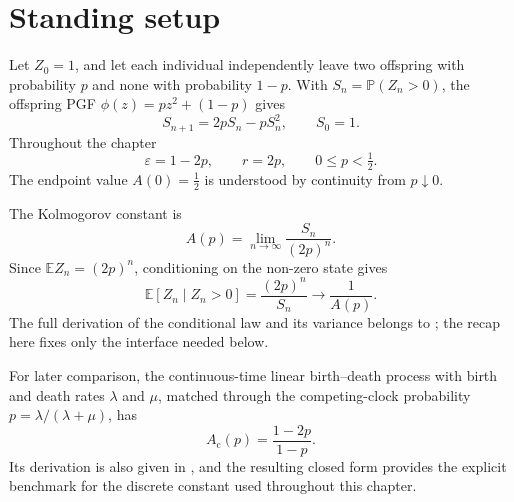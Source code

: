 \section{Standing setup}\label{a:sec:setup}

Let \(Z_0=1\), and let each individual independently leave two offspring with
probability \(p\) and none with probability \(1-p\).  With
\(S_n=\mathbb P(Z_n>0)\), the offspring PGF
\(\phi(z)=pz^2+(1-p)\) gives
\begin{equation}
 S_{n+1}=2pS_n-pS_n^2,
 \qquad S_0=1.
 \label{a:eq:SnIter}
\end{equation}
Throughout the chapter
\begin{equation}
 \varepsilon=1-2p,
 \qquad r=2p,
 \qquad 0\le p<\tfrac12.
 \label{a:eq:epsdef}
\end{equation}
The endpoint value \(A(0)=\tfrac12\) is understood by continuity from
\(p\downarrow0\).

The Kolmogorov constant is
\begin{equation}
 A(p)=\lim_{n\to\infty}\frac{S_n}{(2p)^n}.
 \label{a:eq:setup-A}
\end{equation}
Since \(\mathbb E Z_n=(2p)^n\), conditioning on the non-zero state gives
\begin{equation}
 \mathbb E[Z_n\mid Z_n>0]=\frac{(2p)^n}{S_n}
 \longrightarrow\frac1{A(p)}.
 \label{a:eq:qsmean}
\end{equation}
The full derivation of the conditional law and its variance belongs to \ChM; the
recap here fixes only the interface needed below.

For later comparison, the continuous-time linear birth--death process with birth
and death rates \(\lambda\) and \(\mu\), matched through the competing-clock
probability \(p=\lambda/(\lambda+\mu)\), has
\begin{equation}
 A_{\mathrm c}(p)=\frac{1-2p}{1-p}.
 \label{a:eq:Acts}
\end{equation}
Its derivation is also given in \ChM, and the resulting closed form provides the
explicit benchmark for the discrete constant used throughout this chapter.
